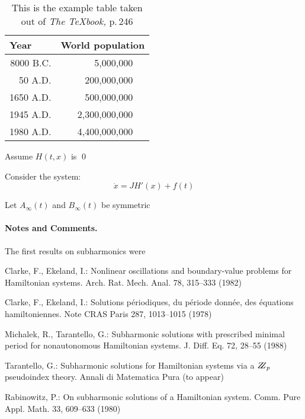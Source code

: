 \documentclass{llncs}
\begin{document}
\begin{table}
\caption{This is the example table taken out of {\it The \TeX{}book,} p.\,246} \begin{center} \begin{tabular}{r@{\quad}rl} \hline \multicolumn{1}{l}{\rule{0pt}{12pt}
                    Year}&\multicolumn{2}{l}{World population}\\[2pt] \hline\rule{0pt}{12pt}
8000 B.C.  &     5,000,000& \\
   50 A.D.  &   200,000,000& \\
1650 A.D.  &   500,000,000& \\
1945 A.D.  & 2,300,000,000& \\
1980 A.D.  & 4,400,000,000& \\[2pt]
\hline
\end{tabular}
\end{center}
\end{table}
%
\begin{theorem} \label{ghou:pre}
Assume $H(t,x)$ is
\qed
\end{theorem}
%
\begin{example}  Consider the system:
\begin{equation}
   \dot{x} = JH' (x) + f(t)
\end{equation}
\end{example}
%
\begin{definition}
Let $A_{\infty} (t)$ and $B_{\infty} (t)$ be symmetric
\end{definition}
%

\paragraph{Notes and Comments.}
The first results on subharmonics were


%
%
\begin{thebibliography}{5}
%
Clarke, F., Ekeland, I.:
Nonlinear oscillations and
boundary-value problems for Hamiltonian systems.
Arch. Rat. Mech. Anal. 78, 315--333 (1982)

Clarke, F., Ekeland, I.:
Solutions p\'{e}riodiques, du
p\'{e}riode donn\'{e}e, des \'{e}quations hamiltoniennes.
Note CRAS Paris 287, 1013--1015 (1978)

Michalek, R., Tarantello, G.:
Subharmonic solutions with prescribed minimal period for nonautonomous Hamiltonian systems.
J. Diff. Eq. 72, 28--55 (1988)

Tarantello, G.:
Subharmonic solutions for Hamiltonian
systems via a $\bbbz_{p}$ pseudoindex theory.
Annali di Matematica Pura (to appear)

Rabinowitz, P.:
On subharmonic solutions of a Hamiltonian system.
Comm. Pure Appl. Math. 33, 609--633 (1980)

\end{thebibliography}
\end{document}

